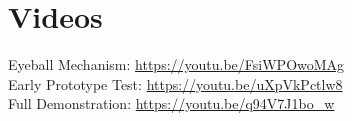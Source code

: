 \chapter{Videos}
\label{ch:videos}
Eyeball Mechanism: \url{https://youtu.be/FsiWPOwoMAg}\\
Early Prototype Test: \url{https://youtu.be/uXpVkPctlw8}\\
Full Demonstration: \url{https://youtu.be/q94V7J1bo_w}